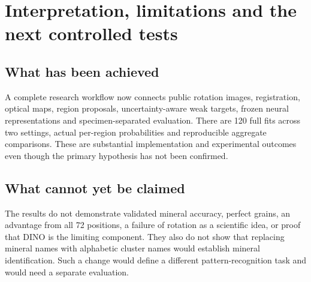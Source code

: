 \FloatBarrier

\section{Interpretation, limitations and the next controlled tests}
\subsection{What has been achieved}
A complete research workflow now connects public rotation images, registration, optical maps, region proposals, uncertainty-aware weak targets, frozen neural representations and specimen-separated evaluation. There are 120 full fits across two settings, actual per-region probabilities and reproducible aggregate comparisons. These are substantial implementation and experimental outcomes even though the primary hypothesis has not been confirmed.

\subsection{What cannot yet be claimed}
The results do not demonstrate validated mineral accuracy, perfect grains, an advantage from all 72 positions, a failure of rotation as a scientific idea, or proof that DINO is the limiting component. They also do not show that replacing mineral names with alphabetic cluster names would establish mineral identification. Such a change would define a different pattern-recognition task and would need a separate evaluation.

